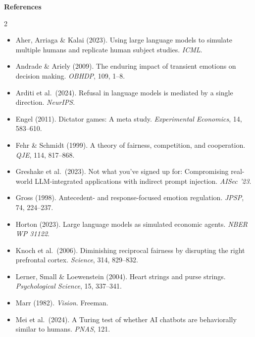 \documentclass[10pt,a4paper]{article}
\begin{document}
\vspace{-2pt}
\begin{center}\textbf{References}\end{center}
\vspace{-8pt}
{\scriptsize
\setlength{\columnsep}{12pt}
\begin{multicols}{2}
\begin{itemize}[leftmargin=0.9em,itemsep=0pt,topsep=0pt,parsep=0pt]
  \item Aher, Arriaga \& Kalai (2023). Using large language models to simulate multiple humans and replicate human subject studies. \textit{ICML}.
  \item Andrade \& Ariely (2009). The enduring impact of transient emotions on decision making. \textit{OBHDP}, 109, 1--8.
  \item Arditi et al.\ (2024). Refusal in language models is mediated by a single direction. \textit{NeurIPS}.
  \item Engel (2011). Dictator games: A meta study. \textit{Experimental Economics}, 14, 583--610.
  \item Fehr \& Schmidt (1999). A theory of fairness, competition, and cooperation. \textit{QJE}, 114, 817--868.
  \item Greshake et al.\ (2023). Not what you've signed up for: Compromising real-world LLM-integrated applications with indirect prompt injection. \textit{AISec '23}.
  \item Gross (1998). Antecedent- and response-focused emotion regulation. \textit{JPSP}, 74, 224--237.
  \item Horton (2023). Large language models as simulated economic agents. \textit{NBER WP 31122}.
  \item Knoch et al.\ (2006). Diminishing reciprocal fairness by disrupting the right prefrontal cortex. \textit{Science}, 314, 829--832.
  \item Lerner, Small \& Loewenstein (2004). Heart strings and purse strings. \textit{Psychological Science}, 15, 337--341.
  \item Marr (1982). \textit{Vision}. Freeman.
  \item Mei et al.\ (2024). A Turing test of whether AI chatbots are behaviorally similar to humans. \textit{PNAS}, 121.

\end{itemize}
\end{multicols}}
\end{document}
